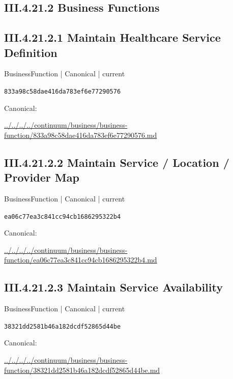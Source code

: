 \documentclass[10pt,a4paper]{article}
\begin{document}
\subsection*{III.4.21.2 Business Functions}
\subsection*{III.4.21.2.1 Maintain Healthcare Service Definition}
{\small BusinessFunction | Canonical | current}\par
\texttt{833a98c58dae416da783ef6e77290576}\par
Canonical: \par
{\footnotesize\url{../../../../continuum/business/business-function/833a98c58dae416da783ef6e77290576.md}}\par
\subsection*{III.4.21.2.2 Maintain Service / Location / Provider Map}
{\small BusinessFunction | Canonical | current}\par
\texttt{ea06c77ea3c841cc94cb1686295322b4}\par
Canonical: \par
{\footnotesize\url{../../../../continuum/business/business-function/ea06c77ea3c841cc94cb1686295322b4.md}}\par
\subsection*{III.4.21.2.3 Maintain Service Availability}
{\small BusinessFunction | Canonical | current}\par
\texttt{38321dd2581b46a182dcdf52865d44be}\par
Canonical: \par
{\footnotesize\url{../../../../continuum/business/business-function/38321dd2581b46a182dcdf52865d44be.md}}\par
\end{document}
